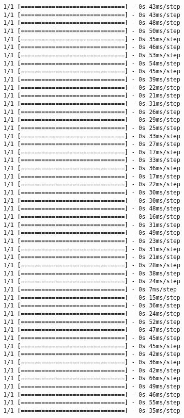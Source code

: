 \documentclass[11pt]{article}
\begin{document}
\begin{Verbatim}[commandchars=\\\{\}]
1/1 [==============================] - 0s 43ms/step
1/1 [==============================] - 0s 43ms/step
1/1 [==============================] - 0s 48ms/step
1/1 [==============================] - 0s 50ms/step
1/1 [==============================] - 0s 35ms/step
1/1 [==============================] - 0s 46ms/step
1/1 [==============================] - 0s 53ms/step
1/1 [==============================] - 0s 54ms/step
1/1 [==============================] - 0s 45ms/step
1/1 [==============================] - 0s 39ms/step
1/1 [==============================] - 0s 22ms/step
1/1 [==============================] - 0s 21ms/step
1/1 [==============================] - 0s 31ms/step
1/1 [==============================] - 0s 26ms/step
1/1 [==============================] - 0s 29ms/step
1/1 [==============================] - 0s 25ms/step
1/1 [==============================] - 0s 33ms/step
1/1 [==============================] - 0s 27ms/step
1/1 [==============================] - 0s 17ms/step
1/1 [==============================] - 0s 33ms/step
1/1 [==============================] - 0s 36ms/step
1/1 [==============================] - 0s 17ms/step
1/1 [==============================] - 0s 22ms/step
1/1 [==============================] - 0s 30ms/step
1/1 [==============================] - 0s 30ms/step
1/1 [==============================] - 0s 48ms/step
1/1 [==============================] - 0s 16ms/step
1/1 [==============================] - 0s 31ms/step
1/1 [==============================] - 0s 49ms/step
1/1 [==============================] - 0s 23ms/step
1/1 [==============================] - 0s 31ms/step
1/1 [==============================] - 0s 21ms/step
1/1 [==============================] - 0s 28ms/step
1/1 [==============================] - 0s 38ms/step
1/1 [==============================] - 0s 24ms/step
1/1 [==============================] - 0s 7ms/step
1/1 [==============================] - 0s 15ms/step
1/1 [==============================] - 0s 36ms/step
1/1 [==============================] - 0s 24ms/step
1/1 [==============================] - 0s 52ms/step
1/1 [==============================] - 0s 47ms/step
1/1 [==============================] - 0s 45ms/step
1/1 [==============================] - 0s 45ms/step
1/1 [==============================] - 0s 42ms/step
1/1 [==============================] - 0s 36ms/step
1/1 [==============================] - 0s 42ms/step
1/1 [==============================] - 0s 66ms/step
1/1 [==============================] - 0s 49ms/step
1/1 [==============================] - 0s 46ms/step
1/1 [==============================] - 0s 55ms/step
1/1 [==============================] - 0s 35ms/step

\end{Verbatim}
\end{document}
